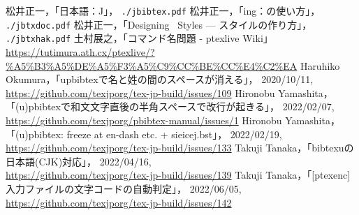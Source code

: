 \documentclass[a4paper,11pt,nomag,dvipdfmx]{jsarticle}
\def\file#1{\texttt{#1}}
\def\JBibTeX{\leavevmode\textcompwordmark\lower.5ex\hbox{J}\kern-.08em\BibTeX}
\def\JBibTeX{J\BibTeX}%
\begin{document}
\clearpage
\begin{thebibliography}{99}
  松井正一，「日本語\BibTeX ：\JBibTeX」，
  \file{./jbibtex.pdf}
  松井正一，「\BibTeX ing：\BibTeX の使い方」，
  \file{./jbtxdoc.pdf}
  松井正一，「Designing \BibTeX\ Styles --- \BibTeX スタイルの作り方」，
  \file{./jbtxhak.pdf}
  土村展之，「コマンド名問題 - ptexlive Wiki」\\
  \url{https://tutimura.ath.cx/ptexlive/?%A5%B3%A5%DE%A5%F3%A5%C9%CC%BE%CC%E4%C2%EA}
  Haruhiko Okumura，「upbibtexで名と姓の間のスペースが消える」，
  2020/10/11,\\
  \url{https://github.com/texjporg/tex-jp-build/issues/109}
  Hironobu Yamashita，「(u)pbibtexで和文文字直後の半角スペースで改行が起きる」，
  2022/02/07,\\
  \url{https://github.com/texjporg/pbibtex-manual/issues/1}
  Hironobu Yamashita，「(u)pbibtex: freeze at en-dash etc. + sieicej.bst」，
  2022/02/19,\\
  \url{https://github.com/texjporg/tex-jp-build/issues/133}
  Takuji Tanaka，「bibtexuの日本語(CJK)対応」，
  2022/04/16,\\
  \url{https://github.com/texjporg/tex-jp-build/issues/139}
  Takuji Tanaka，「[ptexenc] 入力ファイルの文字コードの自動判定」，
  2022/06/05,\\
  \url{https://github.com/texjporg/tex-jp-build/issues/142}
\end{thebibliography}
\end{document}
